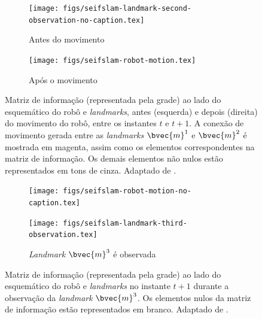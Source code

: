 \begin{figure}[h]
  \begin{subfigure}{0.475\textwidth}
    \texttt{[image: figs/seifslam-landmark-second-observation-no-caption.tex]}
    \caption{Antes do movimento}
  \end{subfigure}
  \hfill
  \begin{subfigure}{0.475\textwidth}
    \texttt{[image: figs/seifslam-robot-motion.tex]} 
    \caption{Após o movimento}
    \label{fig:seifslam-info-matrix-construction-motion-b}
  \end{subfigure}
  \caption[Elementos da matriz de informação durante o movimento do robô (passo de predição do filtro)]{Matriz de informação (representada pela grade) ao lado do esquemático do robô e \textit{landmarks}, antes (esquerda) e depois (direita) do movimento do robô, entre os instantes $t$ e $t+1$. A conexão de movimento gerada entre as \textit{landmarks} $\bvec{m}^1$ e $\bvec{m}^2$ é mostrada em magenta, assim como os elementos correspondentes na matriz de informação. Os demais elementos não nulos estão representados em tons de cinza. Adaptado de \cite[p.~389]{thrun2005probabilistic}. }
  \label{fig:seifslam-info-matrix-construction-motion}
\end{figure}

\begin{figure}[h]
  \begin{subfigure}{0.475\textwidth}
    \texttt{[image: figs/seifslam-robot-motion-no-caption.tex]} 
    \caption{}
  \end{subfigure}
  \hfill
  \begin{subfigure}{0.475\textwidth}
    \texttt{[image: figs/seifslam-landmark-third-observation.tex]}
    \caption{\textit{Landmark} $\bvec{m}^3$ é observada}
    \label{fig:seifslam-info-matrix-construction-third-observation-b}
  \end{subfigure}
  \caption[Elementos da matriz de informação durante observação do terceiro \textit{landmark}]{Matriz de informação (representada pela grade) ao lado do esquemático do robô e \textit{landmarks} no instante $t+1$ durante a observação da \textit{landmark} $\bvec{m}^3$. Os elementos nulos da matriz de informação estão representados em branco. Adaptado de \cite[p.~389]{thrun2005probabilistic}.}
  \label{fig:seifslam-info-matrix-construction-third-observation}
\end{figure}

